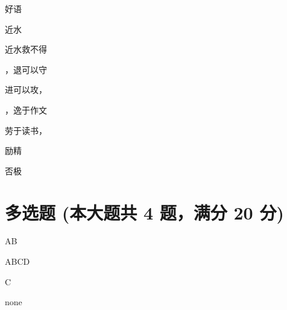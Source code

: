 \documentclass[12pt, a4paper, addpoints]{exam}
\begin{document}
\begin{multicols}{2}
\begin{questions}
\question[2] 

\question[2] 好语\fillin

\question[2] 

\question[2] 近水

\question[2] 近水救不得\fillin

\question[2] \fillin，退可以守

\question[2] 进可以攻，\fillin

\question[2] \fillin，逸于作文

\question[2] 劳于读书，\fillin

\question[2] 

\question[2] 励精\fillin

\question[2] 

\question[2] 否极\fillin

\end{questions}
\end{multicols}

\hspace{5cm}

\section{\normalsize{多选题 (本大题共 4 题，满分 20 分)}}
\hspace{1.5cm}

\begin{questions}
\question[5] AB

\begin{oneparcheckboxes}
\end{oneparcheckboxes}

\question[5] ABCD

\begin{oneparcheckboxes}
\end{oneparcheckboxes}

\question[5] C

\begin{oneparcheckboxes}
\end{oneparcheckboxes}

\question[5] none

\begin{oneparcheckboxes}
\end{oneparcheckboxes}

\end{questions}
\end{document}
